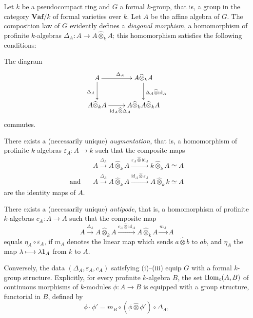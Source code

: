 Let $k$ be a pseudocompact ring and $G$ a formal $k$-group, that is, a group in the category $\mathbf{Vaf}/k$ of formal varieties over $k$. Let $A$ be the affine algebra of $G$. The composition law of $G$ evidently defines a \emph{diagonal morphism}, \ie a homomorphism of profinite $k$-algebras $\Delta_A:A\to A\widehat\otimes_k A$; this homomorphism satisfies the following conditions:
\begin{enumeratei}
\item The diagram
\[
\xymatrix{
A\ar[r]^{\Delta_A}\ar[d]_{\Delta_A}&A\widehat\otimes_k A\ar[d]^{\Delta_A\widehat\otimes\mathrm{id}_A}\\
A\widehat\otimes_k A\ar[r]_{\mathrm{id}_A\widehat\otimes\Delta_A}&A\widehat\otimes_k A\widehat\otimes_k A}
\]
commutes.
\item There exists a (necessarily unique) \emph{augmentation}, that is, a homomorphism of profinite $k$-algebras $\varepsilon_A:A\to k$ such that the composite maps
\[
\begin{aligned}
&A\xrightarrow{\Delta_A}A\widehat\otimes_k A\xrightarrow{\varepsilon_A\widehat\otimes\mathrm{id}_A}k\widehat\otimes_k A\simeq A\\
\text{and}\quad&A\xrightarrow{\Delta_A}A\widehat\otimes_k A\xrightarrow{\mathrm{id}_A\widehat\otimes\varepsilon_A}A\widehat\otimes_k k\simeq A
\end{aligned}
\]
are the identity maps of $A$.
\item There exists a (necessarily unique) \emph{antipode}, that is, a homomorphism of profinite $k$-algebras $c_A:A\to A$ such that the composite map
\[
A\xrightarrow{\Delta_A}A\widehat\otimes_k A\xrightarrow{c_A\widehat\otimes\mathrm{id}_A}A\widehat\otimes_k A\xrightarrow{m_A}A
\]
equals $\eta_A\circ\varepsilon_A$, if $m_A$ denotes the linear map which sends $a\widehat\otimes b$ to $ab$, and $\eta_A$ the map $\lambda\longmapsto\lambda1_A$ from $k$ to $A$.
\end{enumeratei}
Conversely, the data $(\Delta_A,\varepsilon_A,c_A)$ satisfying (i)--(iii) equip $G$ with a formal $k$-group structure. Explicitly, for every profinite $k$-algebra $B$, the set $\operatorname{Hom}_c(A,B)$ of continuous morphisms of $k$-modules $\phi:A\to B$ is equipped with a group structure, functorial in $B$, defined by
\[
\phi\cdot\phi'=m_B\circ(\phi\widehat\otimes\phi')\circ\Delta_A,
\]
